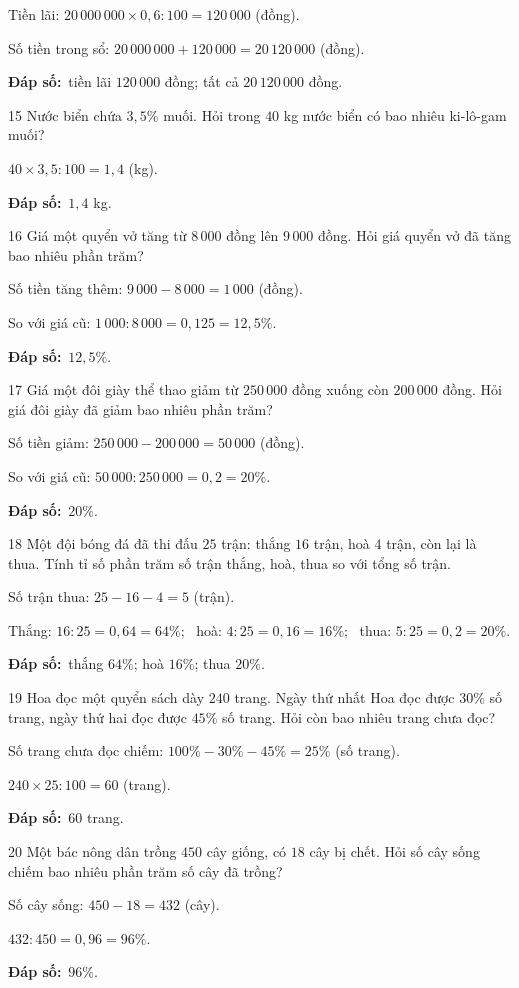 \documentclass[11pt]{article}
\newif\ifsol \solfalse
\providecommand{\AnsWord}{Đáp số}
\newcommand{\dapso}[1]{\par\textbf{\AnsWord:}\ #1}
\newcommand{\probsol}[1]{%
  \begin{lrbox}{\solmeasure}\begin{minipage}{\dimexpr\linewidth-24pt\relax}#1\end{minipage}\end{lrbox}%
  \ifsol
    \begin{solbox}#1\end{solbox}%
  \else
    \setlength{\solht}{\dimexpr\ht\solmeasure+\dp\solmeasure+0.85cm\relax}%
    \ifdim\solht<1.35cm\setlength{\solht}{1.35cm}\fi
    \begin{tcolorbox}[colback=white,colframe=Line,boxrule=0.8pt,arc=5pt,
      left=8pt,right=8pt,top=4pt,bottom=4pt,height=\solht]{\footnotesize\color{Slate}\itshape\WorkWord}\end{tcolorbox}%
  \fi}
\newcommand{\gap}{\vspace{0.3cm}}
\def\WorkWord{Bài làm:}
\def\AnsWord{Đáp số}
\begin{document}
\probsol{
Tiền lãi: $20\,000\,000\times0{,}6:100=120\,000$ (đồng).\par
Số tiền trong sổ: $20\,000\,000+120\,000=20\,120\,000$ (đồng).
\dapso{tiền lãi $120\,000$ đồng; tất cả $20\,120\,000$ đồng.}}
\gap
\begin{probbox}{15}{\relax}
Nước biển chứa $3{,}5\%$ muối. Hỏi trong $40$ kg nước biển có bao nhiêu ki-lô-gam muối?
\end{probbox}
\probsol{
$40\times3{,}5:100=1{,}4$ (kg).
\dapso{$1{,}4$ kg.}}
\gap
\begin{probbox}{16}{\relax}
Giá một quyển vở tăng từ $8\,000$ đồng lên $9\,000$ đồng. Hỏi giá quyển vở đã tăng bao nhiêu phần trăm?
\end{probbox}
\probsol{
Số tiền tăng thêm: $9\,000-8\,000=1\,000$ (đồng).\par
So với giá cũ: $1\,000:8\,000=0{,}125=12{,}5\%$.
\dapso{$12{,}5\%$.}}
\gap
\begin{probbox}{17}{\relax}
Giá một đôi giày thể thao giảm từ $250\,000$ đồng xuống còn $200\,000$ đồng. Hỏi giá đôi giày đã giảm bao nhiêu phần trăm?
\end{probbox}
\probsol{
Số tiền giảm: $250\,000-200\,000=50\,000$ (đồng).\par
So với giá cũ: $50\,000:250\,000=0{,}2=20\%$.
\dapso{$20\%$.}}
\gap
\begin{probbox}{18}{\relax}
Một đội bóng đá đã thi đấu $25$ trận: thắng $16$ trận, hoà $4$ trận, còn lại là thua. Tính tỉ số phần trăm số trận thắng, hoà, thua so với tổng số trận.
\end{probbox}
\probsol{
Số trận thua: $25-16-4=5$ (trận).\par
Thắng: $16:25=0{,}64=64\%$; \ hoà: $4:25=0{,}16=16\%$; \ thua: $5:25=0{,}2=20\%$.
\dapso{thắng $64\%$; hoà $16\%$; thua $20\%$.}}
\gap
\begin{probbox}{19}{\relax}
Hoa đọc một quyển sách dày $240$ trang. Ngày thứ nhất Hoa đọc được $30\%$ số trang, ngày thứ hai đọc được $45\%$ số trang. Hỏi còn bao nhiêu trang chưa đọc?
\end{probbox}
\probsol{
Số trang chưa đọc chiếm: $100\%-30\%-45\%=25\%$ (số trang).\par
$240\times25:100=60$ (trang).
\dapso{$60$ trang.}}
\gap
\begin{probbox}{20}{\relax}
Một bác nông dân trồng $450$ cây giống, có $18$ cây bị chết. Hỏi số cây sống chiếm bao nhiêu phần trăm số cây đã trồng?
\end{probbox}
\probsol{
Số cây sống: $450-18=432$ (cây).\par
$432:450=0{,}96=96\%$.
\dapso{$96\%$.}}
\end{document}
